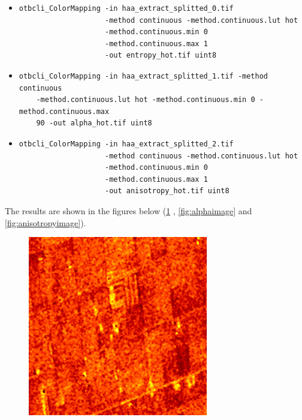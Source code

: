 \begin{itemize}
\item 
\begin{verbatim} 
otbcli_ColorMapping -in haa_extract_splitted_0.tif 
                    -method continuous -method.continuous.lut hot 
                    -method.continuous.min 0 
                    -method.continuous.max 1
                    -out entropy_hot.tif uint8 
\end{verbatim}
									  
\item 
\begin{verbatim} 
otbcli_ColorMapping -in haa_extract_splitted_1.tif -method continuous 
    -method.continuous.lut hot -method.continuous.min 0 -method.continuous.max
    90 -out alpha_hot.tif uint8 
\end{verbatim}
									  
\item 
\begin{verbatim} 
otbcli_ColorMapping -in haa_extract_splitted_2.tif 
                    -method continuous -method.continuous.lut hot 
                    -method.continuous.min 0 
                    -method.continuous.max 1
                    -out anisotropy_hot.tif uint8 
\end{verbatim}
\end{itemize}

The results are shown in the figures below (\ref{fig:entropyimage}
, \ref{fig:alphaimage} and \ref{fig:anisotropyimage}).
\begin{figure}[!h]
\center
\includegraphics[width=0.7\textwidth]{../Art/SARImages/entropyhot.png}
\label{fig:entropyimage}
\end{figure}

